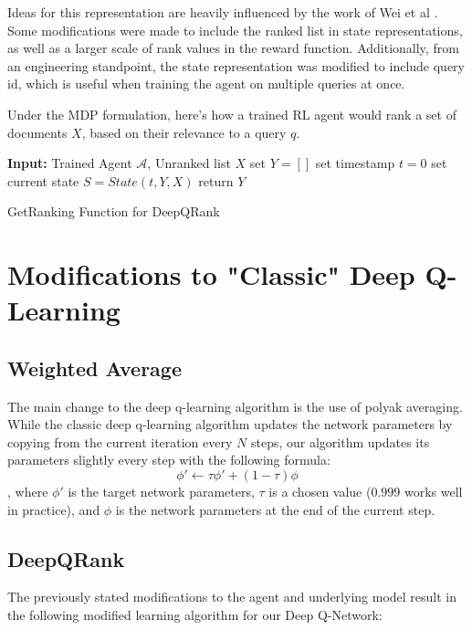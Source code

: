 \documentclass{article}
\begin{document}
Ideas for this representation are heavily influenced by the work of Wei et al \cite{source1}. Some modifications were made to include the ranked list in state representations, as well as a larger scale of rank values in the reward function. Additionally, from an engineering standpoint, the state representation was modified to include query id, which is useful when training the agent on multiple queries at once.

Under the MDP formulation, here's how a trained RL agent would rank a set of documents $X$, based on their relevance to a query $q$.

\begin{algorithm}[H]
\SetAlgoLined
{}
 \textbf{Input:} Trained Agent $\mathcal{A}$, Unranked list $X$\;
 set $Y = []$\;
 set timestamp $t = 0$\;
 set current state $S = State(t, Y, X)$\;
 return $Y$\;
 \caption{GetRanking Function for DeepQRank}
\end{algorithm}

\section{Modifications to "Classic" Deep Q-Learning}

\subsection{Weighted Average}
The main change to the deep q-learning algorithm is the use of polyak averaging. While the classic deep q-learning algorithm updates the network parameters by copying from the current iteration every $N$ steps, our algorithm updates its parameters slightly every step with the following formula:
$$\phi' \leftarrow \tau \phi' + (1-\tau) \phi$$
, where $\phi'$ is the target network parameters, $\tau$ is a chosen value ($0.999$ works well in practice), and $\phi$ is the network parameters at the end of the current step.

\subsection{DeepQRank}

The previously stated modifications to the agent and underlying model result in the following modified learning algorithm for our Deep Q-Network:
\end{document}
